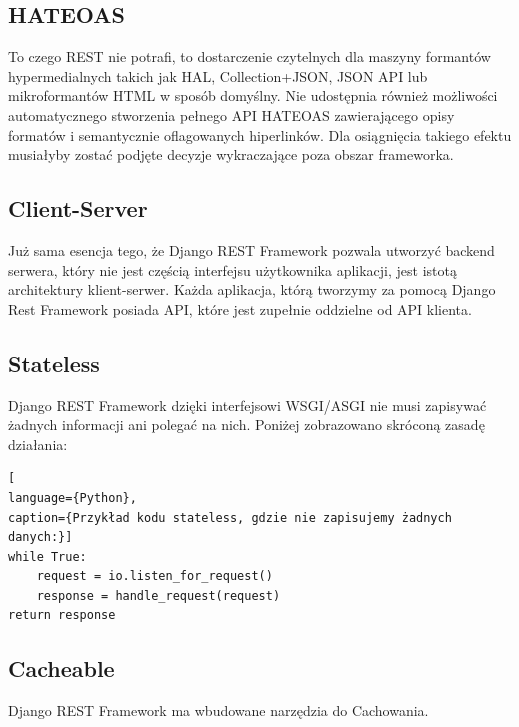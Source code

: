 \documentclass[oneside,polski,logo,indent]{amuthesis}
\begin{document}
\newpage 
\begin{center}
\subsection{HATEOAS}
\end{center}
To czego REST nie potrafi, to dostarczenie czytelnych dla maszyny formantów hypermedialnych takich jak HAL, Collection+JSON, JSON API lub mikroformantów HTML w sposób domyślny. Nie udostępnia również możliwości automatycznego stworzenia pełnego API HATEOAS zawierającego opisy formatów i semantycznie oflagowanych hiperlinków. Dla osiągnięcia takiego efektu musiałyby zostać podjęte decyzje wykraczające poza obszar frameworka. 
\begin{center}
\subsection{Client-Server}
\end{center}
Już sama esencja tego, że Django REST Framework pozwala utworzyć backend serwera, który nie jest częścią interfejsu użytkownika aplikacji, jest istotą architektury klient-serwer. Każda aplikacja, którą tworzymy za pomocą Django Rest Framework posiada API, które jest zupełnie oddzielne od API klienta. 
\begin{center}
\subsection{Stateless}
\end{center}
Django REST Framework dzięki interfejsowi WSGI/ASGI nie musi zapisywać żadnych informacji ani polegać na nich. Poniżej zobrazowano skróconą zasadę działania:



\begin{lstlisting}[
language={Python},
caption={Przykład kodu stateless, gdzie nie zapisujemy żadnych danych:}]
while True:
    request = io.listen_for_request()
    response = handle_request(request)
return response
\end{lstlisting}

\begin{center}
\subsection{Cacheable}
\end{center}
Django REST Framework ma wbudowane narzędzia do Cachowania.
\end{document}
